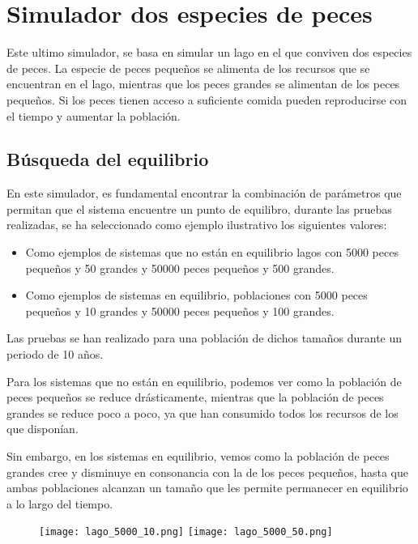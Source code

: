 \chapter{Simulador dos especies de peces}
Este ultimo simulador, se basa en simular un lago en el que conviven dos especies de peces. La especie de peces pequeños se alimenta de los recursos que se encuentran en el lago, mientras que los peces grandes se alimentan de los peces pequeños. Si los peces tienen acceso a suficiente comida pueden reproducirse con el tiempo y aumentar la población.

\section{Búsqueda del equilibrio}
En este simulador, es fundamental encontrar la combinación de parámetros que permitan que el sistema encuentre un punto de equilibro, durante las pruebas realizadas, se ha seleccionado como ejemplo ilustrativo los siguientes valores:

\begin{itemize}
	\item Como ejemplos de sistemas que no están en equilibrio lagos con 5000 peces pequeños y 50 grandes y 50000 peces pequeños y 500 grandes.
	\item Como ejemplos de sistemas en equilibrio, poblaciones con 5000 peces pequeños y 10 grandes y 50000 peces pequeños y 100 grandes.
\end{itemize}

Las pruebas se han realizado para una población de dichos tamaños durante un periodo de 10 años.

Para los sistemas que no están en equilibrio, podemos ver como la población de peces pequeños se reduce drásticamente, mientras que la población de peces grandes se reduce poco a poco, ya que han consumido todos los recursos de los que disponían.

Sin embargo, en los sistemas en equilibrio, vemos como la población de peces grandes cree y disminuye en consonancia con la de los peces pequeños, hasta que ambas poblaciones alcanzan un tamaño que les permite permanecer en equilibrio a lo largo del tiempo.

\newpage
\newpage

\begin{figure}[h]
\texttt{[image: lago\_5000\_10.png]}
\texttt{[image: lago\_5000\_50.png]}
\centering
\end{figure}

